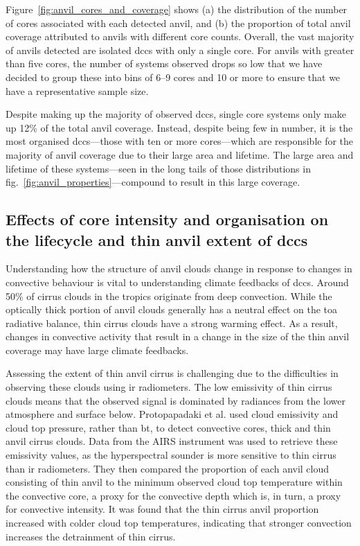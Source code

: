 Figure~\ref{fig:anvil_cores_and_coverage} shows (a) the distribution of the number of cores associated with each detected anvil, and (b) the proportion of total anvil coverage attributed to anvils with different core counts.
Overall, the vast majority of anvils detected are isolated \acrshort{dcc}s with only a single core.
For anvils with greater than five cores, the number of systems observed drops so low that we have decided to group these into bins of 6--9 cores and 10 or more to ensure that we have a representative sample size.

Despite making up the majority of observed \acrshort{dcc}s, single core systems only make up 12\% of the total anvil coverage.
Instead, despite being few in number, it is the most organised \acrshort{dcc}s---those with ten or more cores---which are responsible for the majority of anvil coverage due to their large area and lifetime.
The large area and lifetime of these systems---seen in the long tails of those distributions in fig.~\ref{fig:anvil_properties}---compound to result in this large coverage.

\subsection{Effects of core intensity and organisation on the lifecycle and thin anvil extent of \acrshort{dcc}s}

Understanding how the structure of anvil clouds change in response to changes in convective behaviour is vital to understanding climate feedbacks of \acrshort{dcc}s.
Around 50\% of cirrus clouds in the tropics originate from deep convection.
While the optically thick portion of anvil clouds generally has a neutral effect on the \acrshort{toa} radiative balance, thin cirrus clouds have a strong warming effect.
As a result, changes in convective activity that result in a change in the size of the thin anvil coverage may have large climate feedbacks.

Assessing the extent of thin anvil cirrus is challenging due to the difficulties in observing these clouds using \acrshort{ir} radiometers.
The low emissivity of thin cirrus clouds means that the observed signal is dominated by radiances from the lower atmosphere and surface below.
Protopapadaki et al. used cloud emissivity and cloud top pressure, rather than \acrshort{bt}, to detect convective cores, thick and thin anvil cirrus clouds.
Data from the AIRS instrument was used to retrieve these emissivity values, as the hyperspectral sounder is more sensitive to thin cirrus than \acrshort{ir} radiometers.
They then compared the proportion of each anvil cloud consisting of thin anvil to the minimum observed cloud top temperature within the convective core, a proxy for the convective depth which is, in turn, a proxy for convective intensity.
It was found that the thin cirrus anvil proportion increased with colder cloud top temperatures, indicating that stronger convection increases the detrainment of thin cirrus.

